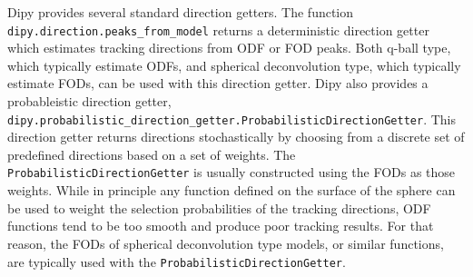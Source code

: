     Dipy provides several standard direction getters. The function \verb|dipy.direction.peaks_from_model| returns a deterministic direction getter which estimates tracking directions from ODF or FOD peaks. Both q-ball type, which typically estimate ODFs, and spherical deconvolution type, which typically estimate FODs, can be used with this direction getter. Dipy also provides a probableistic direction getter, \verb|dipy.probabilistic_direction_getter.ProbabilisticDirectionGetter|. This direction getter returns directions stochastically by choosing from a discrete set of predefined directions based on a set of weights. The \verb|ProbabilisticDirectionGetter| is usually constructed using the FODs as those weights. While in principle any function defined on the surface of the sphere can be used to weight the selection probabilities of the tracking directions, ODF functions tend to be too smooth and produce poor tracking results. For that reason, the FODs of spherical deconvolution type models, or similar functions, are typically used with the \verb|ProbabilisticDirectionGetter|.


